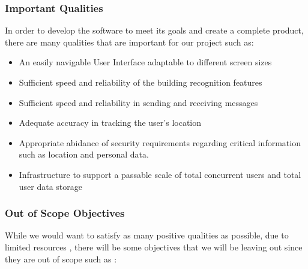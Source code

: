 \documentclass[12pt, titlepage]{article}
\begin{document}
\subsubsection{Important Qualities}
In order to develop the software to meet its goals and create a complete product, there are many qualities that are important for our project such as:

\begin{itemize}
    \item An easily navigable User Interface adaptable to different screen sizes

    \item Sufficient speed and reliability of the building recognition features

    \item Sufficient speed and reliability in sending and receiving messages

    \item Adequate accuracy in tracking the user's location

    \item Appropriate abidance of security requirements regarding critical information such as location and personal data.

    \item Infrastructure to support a passable scale of total concurrent users and total user data storage
    \end{itemize}


\subsubsection{Out of Scope Objectives}
While we would want to satisfy as many positive qualities as possible, due to limited resources , there will be some objectives that we will be leaving out since they are out of scope such as :
\end{document}
